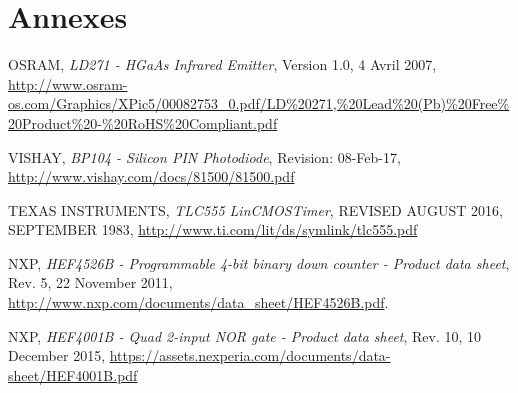 \documentclass[french]{layout/Report}
\begin{document}
\section{Annexes}


\begin{thebibliography}{9}

	OSRAM,
	\textit{LD271 - HGaAs Infrared Emitter},
	Version 1.0,
	4 Avril 2007,
	\url{http://www.osram-os.com/Graphics/XPic5/00082753_0.pdf/LD%20271,%20Lead%20(Pb)%20Free%20Product%20-%20RoHS%20Compliant.pdf}

		VISHAY,
		\textit{BP104 - Silicon PIN Photodiode},
		Revision: 08-Feb-17,
		\url{http://www.vishay.com/docs/81500/81500.pdf}

		TEXAS INSTRUMENTS,
		\textit{TLC555 LinCMOS\texttrademark Timer},
		REVISED AUGUST 2016,
		SEPTEMBER 1983,
		\url{http://www.ti.com/lit/ds/symlink/tlc555.pdf}

		NXP,
		\textit{HEF4526B - Programmable 4-bit binary down counter - Product data sheet},
		Rev. 5,
		22 November 2011,
		\url{http://www.nxp.com/documents/data_sheet/HEF4526B.pdf}.

		NXP,
		\textit{HEF4001B - Quad 2-input NOR gate - Product data sheet},
		Rev. 10,
		10 December 2015,
		\url{https://assets.nexperia.com/documents/data-sheet/HEF4001B.pdf}

\end{thebibliography}
\end{document}
